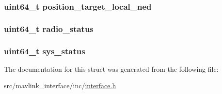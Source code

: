 \subsubsection[{\texorpdfstring{position\+\_\+target\+\_\+local\+\_\+ned}{position_target_local_ned}}]{\setlength{\rightskip}{0pt plus 5cm}uint64\+\_\+t position\+\_\+target\+\_\+local\+\_\+ned}\hypertarget{struct_time___stamps_a90cff6c62a9d017149d202852e3c7881}{}\label{struct_time___stamps_a90cff6c62a9d017149d202852e3c7881}
\subsubsection[{\texorpdfstring{radio\+\_\+status}{radio_status}}]{\setlength{\rightskip}{0pt plus 5cm}uint64\+\_\+t radio\+\_\+status}\hypertarget{struct_time___stamps_a349d4b854b6448bec3938af7bb59a482}{}\label{struct_time___stamps_a349d4b854b6448bec3938af7bb59a482}
\subsubsection[{\texorpdfstring{sys\+\_\+status}{sys_status}}]{\setlength{\rightskip}{0pt plus 5cm}uint64\+\_\+t sys\+\_\+status}\hypertarget{struct_time___stamps_a0c435af1e679e794a97d29f6ad8033c4}{}\label{struct_time___stamps_a0c435af1e679e794a97d29f6ad8033c4}


The documentation for this struct was generated from the following file\+:\begin{DoxyCompactItemize}
\item 
src/mavlink\+\_\+interface/inc/\hyperlink{interface_8h}{interface.\+h}\end{DoxyCompactItemize}
